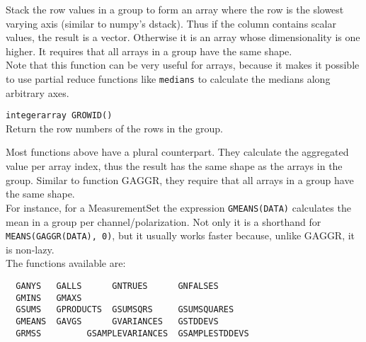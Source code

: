 \begin{description}
    Stack the row values in a group to form an array where the row is
    the slowest varying axis (similar to numpy's dstack). Thus if the
    column contains scalar values, the result is a vector. Otherwise
    it is an array whose dimensionality is one higher. It requires
    that all arrays in a group have the same shape.
    \\Note that this function can be very useful for arrays, because it
    makes it possible to use partial reduce functions like
    \texttt{medians} to calculate the medians along arbitrary axes.
  \item[] \texttt{integerarray GROWID()}\\
    Return the row numbers of the rows in the group.
\end{description}
Most functions above have a plural counterpart. They calculate the aggregated
value per array index, thus the result has the same shape as the
arrays in the group. Similar to function GAGGR, they require that all
arrays in a group have the same shape. 
\\For instance, for a MeasurementSet the expression
\texttt{GMEANS(DATA)} calculates the mean in a group per channel/polarization.
Not only it is a shorthand for \texttt{MEANS(GAGGR(DATA), 0)}, but it
usually works faster because, unlike GAGGR, it is non-lazy.
\\The functions available are:
\begin{verbatim}
  GANYS   GALLS      GNTRUES      GNFALSES
  GMINS   GMAXS
  GSUMS   GPRODUCTS  GSUMSQRS     GSUMSQUARES
  GMEANS  GAVGS      GVARIANCES   GSTDDEVS
  GRMSS         GSAMPLEVARIANCES  GSAMPLESTDDEVS
\end{verbatim}


